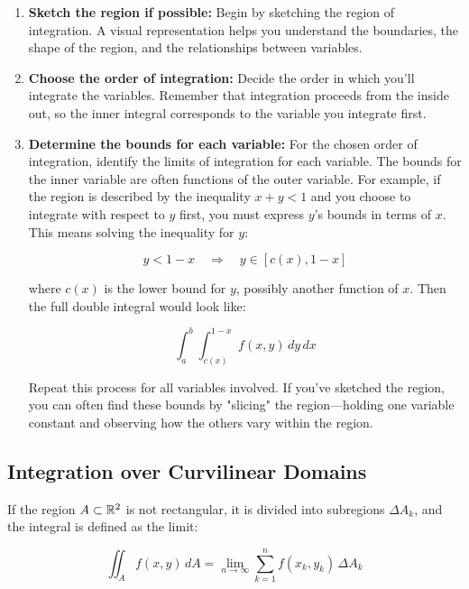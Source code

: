 \begin{enumerate}

    \item \textbf{Sketch the region if possible:} Begin by sketching the region of integration.  
    A visual representation helps you understand the boundaries, the shape of the region, and the relationships between variables.

    \item \textbf{Choose the order of integration:} Decide the order in which you'll integrate the 
    variables. Remember that integration proceeds from the inside out, so the inner integral corresponds to 
    the variable you integrate first.

    \item \textbf{Determine the bounds for each variable: }  For the chosen order of integration, identify 
    the limits of integration for each variable. The bounds for the inner variable are often functions of 
    the outer variable.  For example, if the region is described by the inequality \(x + y < 1\) and you 
    choose to integrate with respect to \(y\) first, you must express \(y\)'s bounds in terms of \(x\). 
    This means solving the inequality for \(y\):  

    \[
        y < 1 - x \quad \Rightarrow \quad y \in [c(x), 1 - x]
    \]  

    where \(c(x)\) is the lower bound for \(y\), possibly another function of \(x\). Then the full double 
    integral would look like:

    \[
        \int_{a}^{b} \int_{c(x)}^{1 - x} f(x, y) \, dy \, dx
    \]  

    Repeat this process for all variables involved. If you’ve sketched the region, you can often find these 
    bounds by "slicing" the region—holding one variable constant and observing how the others vary within 
    the region.

\end{enumerate}

\subsection{Integration over Curvilinear Domains}

If the region \( A \subset \mathbb{R}^2 \) is not rectangular, it is divided into subregions 
\( \Delta A_k \), and the integral is defined as the limit:

\[
    \iint_A f(x, y)\, dA = \lim_{n \to \infty} \sum_{k=1}^n f(x_k, y_k) \, \Delta A_k
\]

